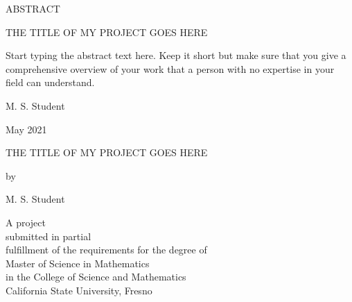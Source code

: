 \documentclass[12pt,leqno]{article}
\theoremstyle{remark}
\begin{document}
\begin{center}
ABSTRACT
\end{center}

\begin{center}
THE TITLE OF MY PROJECT GOES HERE
\end{center}

\doublespacing

Start typing the abstract text here. Keep it short but make sure that you give a comprehensive overview of your work that a person with no expertise in your field can understand.

\singlespacing
\vskip 0.3in
\noindent M. S. Student%

\noindent May 2021 %
\thispagestyle{empty}
\newpage

\mbox{}
\thispagestyle{empty}
\newpage

\begin{center}
THE TITLE OF MY PROJECT GOES HERE
\end{center}

\vskip 2in

\begin{center}
by
\end{center}

\begin{center}
M. S. Student%
\end{center}

\vskip 2in

\begin{center}
A project \\[6pt]
submitted in partial \\[6pt]
fulfillment of the requirements for the degree of \\[6pt]
Master of Science in Mathematics \\[6pt]
in the College of Science and Mathematics \\[6pt]
California State University, Fresno
\end{center}
\end{document}
